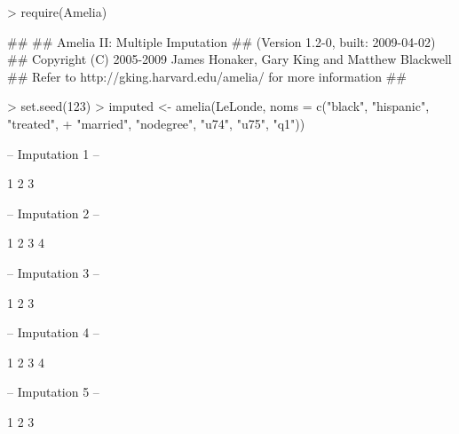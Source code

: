 \documentclass[article]{jss}
\begin{document}
\begin{Schunk}
\begin{Sinput}
> require(Amelia)
\end{Sinput}
\begin{Soutput}
## 
## Amelia II: Multiple Imputation
## (Version 1.2-0, built: 2009-04-02)
## Copyright (C) 2005-2009 James Honaker, Gary King and Matthew Blackwell
## Refer to http://gking.harvard.edu/amelia/ for more information
##
\end{Soutput}
\begin{Sinput}
> set.seed(123)
> imputed <- amelia(LeLonde, noms = c("black", "hispanic", "treated", 
+     "married", "nodegree", "u74", "u75", "q1"))
\end{Sinput}
\begin{Soutput}
-- Imputation 1 --

 1  2  3 

-- Imputation 2 --

 1  2  3  4 

-- Imputation 3 --

 1  2  3 

-- Imputation 4 --

 1  2  3  4 

-- Imputation 5 --

 1  2  3 
\end{Soutput}
\end{Schunk}
\end{document}
